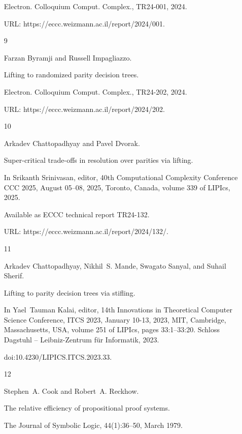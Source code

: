 \documentclass[10pt,a4paper]{article}
\begin{document}
\begin{itemize}
Electron. Colloquium Comput. Complex., TR24-001, 2024.


URL: https://eccc.weizmann.ac.il/report/2024/001.





\item 
[9]

Farzan Byramji and Russell Impagliazzo.


Lifting to randomized parity decision trees.


Electron. Colloquium Comput. Complex., TR24-202, 2024.


URL: https://eccc.weizmann.ac.il/report/2024/202.





\item 
[10]

Arkadev Chattopadhyay and Pavel Dvorak.


Super-critical trade-offs in resolution over parities via lifting.


In Srikanth Srinivasan, editor, 40th Computational Complexity
Conference CCC 2025, August 05–08, 2025, Toronto, Canada, volume 339 of
LIPIcs, 2025.


Available as ECCC technical report TR24-132.


URL: https://eccc.weizmann.ac.il/report/2024/132/.





\item 
[11]

Arkadev Chattopadhyay, Nikhil S. Mande, Swagato Sanyal, and Suhail Sherif.


Lifting to parity decision trees via stifling.


In Yael Tauman Kalai, editor, 14th Innovations in Theoretical
Computer Science Conference, ITCS 2023, January 10-13, 2023, MIT,
Cambridge, Massachusetts, USA, volume 251 of LIPIcs, pages
33:1–33:20. Schloss Dagstuhl – Leibniz-Zentrum für Informatik, 2023.


doi:10.4230/LIPICS.ITCS.2023.33.





\item 
[12]

Stephen A. Cook and Robert A. Reckhow.


The relative efficiency of propositional proof systems.


The Journal of Symbolic Logic, 44(1):36–50, March 1979.



\end{itemize}
\end{document}
